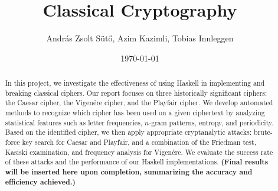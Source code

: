 \documentclass[12pt,a4paper]{article}
\title{Classical Cryptography}
\author{András Zsolt Sütő, Azim Kazimli, Tobias Innleggen}
\date{\today}
\begin{document}
\maketitle


\begin{abstract}
    In this project, we investigate the effectiveness of using Haskell
     in implementing and breaking classical ciphers. Our report focuses on three historically significant ciphers: the Caesar cipher, 
    the Vigenére cipher, and the Playfair cipher. We develop automated methods to recognize which cipher has been used on a given ciphertext by analyzing statistical 
    features such as letter frequencies, $n$-gram patterns, entropy, and periodicity. Based on the identified cipher, we then apply appropriate cryptanalytic attacks: 
    brute-force key search for Caesar and Playfair, and a combination of the Friedman test, Kasiski examination, and frequency analysis for Vigenére. We evaluate the
     success rate of these attacks and the performance of our Haskell implementations. 
      \textbf{(Final results will be inserted here upon completion, summarizing the accuracy and efficiency achieved.)}
    \end{abstract}
\vfill

\tableofcontents

\clearpage






















\end{document}
